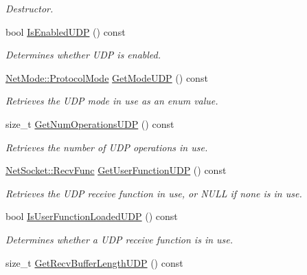 \begin{DoxyCompactItemize}
\begin{DoxyCompactList}\small\item\em Destructor. \item\end{DoxyCompactList}\item 
bool \hyperlink{class_net_instance_u_d_p_a37f316b881b421d1039451586a0eeb70}{IsEnabledUDP} () const 
\begin{DoxyCompactList}\small\item\em Determines whether UDP is enabled. \item\end{DoxyCompactList}\item 
\hyperlink{class_net_mode_a43cfa55ee6a4db66a8d7d6c27f766964}{NetMode::ProtocolMode} \hyperlink{class_net_instance_u_d_p_a344d7df20fa0886b782cd6d7d4f2f4bf}{GetModeUDP} () const 
\begin{DoxyCompactList}\small\item\em Retrieves the UDP mode in use as an enum value. \item\end{DoxyCompactList}\item 
size\_\-t \hyperlink{class_net_instance_u_d_p_a53e2bd543246644e674a36638e0632ba}{GetNumOperationsUDP} () const 
\begin{DoxyCompactList}\small\item\em Retrieves the number of UDP operations in use. \item\end{DoxyCompactList}\item 
\hyperlink{class_net_socket_a52b5f4de8d0a47fd8620f542b21c076c}{NetSocket::RecvFunc} \hyperlink{class_net_instance_u_d_p_a1686c64c0fc1886780ff24556e66ada7}{GetUserFunctionUDP} () const 
\begin{DoxyCompactList}\small\item\em Retrieves the UDP receive function in use, or NULL if none is in use. \item\end{DoxyCompactList}\item 
bool \hyperlink{class_net_instance_u_d_p_acc9ed826290777af81379ddb871c389e}{IsUserFunctionLoadedUDP} () const 
\begin{DoxyCompactList}\small\item\em Determines whether a UDP receive function is in use. \item\end{DoxyCompactList}\item 
size\_\-t \hyperlink{class_net_instance_u_d_p_a4467dd45f0ae82b2c4721a3b04dd3746}{GetRecvBufferLengthUDP} () const 

\end{DoxyCompactItemize}
